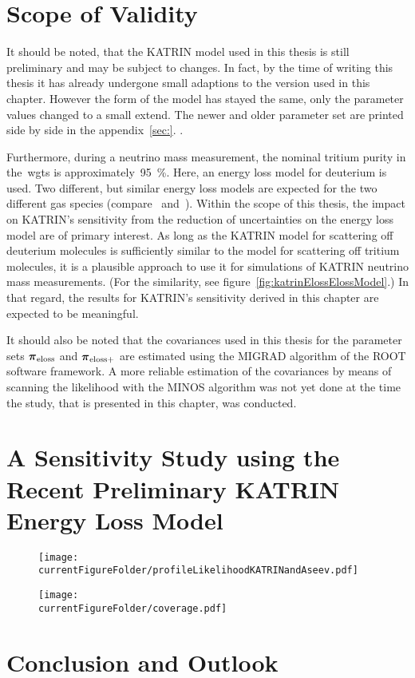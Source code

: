 \section{Scope of Validity}
It should be noted, that the KATRIN model used in this thesis is still preliminary and may be subject to changes. In fact, by the time of writing this thesis it has already undergone small adaptions to the version used in this chapter. However the form of the model has stayed the same, only the parameter values changed to a small extend. The newer and older parameter set are printed side by side in the appendix~\ref{sec:}. .

Furthermore, during a neutrino mass measurement, the nominal tritium purity in the~\gls{wgts} is approximately~\SI{95}{\percent}. Here, an energy loss model for deuterium is used. Two different, but similar energy loss models are expected for the two different gas species (compare~\cite{Abdurashitov2017} and~\cite{Aseev2000}). Within the scope of this thesis, the impact on KATRIN's sensitivity from the reduction of uncertainties on the energy loss model are of primary interest. As long as the KATRIN model for scattering off deuterium molecules is sufficiently similar to the model for scattering off tritium molecules, it is a plausible approach to use it for simulations of KATRIN neutrino mass measurements. (For the similarity, see figure~\ref{fig:katrinElossElossModel}.) In that regard, the results for KATRIN's sensitivity derived in this chapter are expected to be meaningful.

It should also be noted that the covariances used in this thesis for the parameter sets $\boldsymbol{\mathbf{\pi}}_\mathrm{eloss}$ and $\boldsymbol{\mathbf{\pi}}_\mathrm{eloss+}$ are estimated using the MIGRAD algorithm of the ROOT software framework. A more reliable estimation of the covariances by means of scanning the likelihood with the MINOS algorithm was not yet done at the time the study, that is presented in this chapter, was conducted.




\section{A Sensitivity Study using the Recent Preliminary KATRIN Energy Loss Model}
\label{sec:katrinElossModelResults}
\def\currentRootFolder{chapter/sensitivityStudyWithPreliminaryKatrinElossModel}
\def\currentFigureFolder{\currentRootFolder/fig}
\begin{figure}[th]
	\centering
	\texttt{[image: \\currentFigureFolder/profileLikelihoodKATRINandAseev.pdf]}
	\xcaption{}{}{}
	\label{fig:katrinElossResultsProfileLikelihood}
\end{figure}

\begin{figure}[th]
	\centering
	\texttt{[image: \\currentFigureFolder/coverage.pdf]}
	\label{fig:katrinElossResultsCoverage}
\end{figure}


\section{Conclusion and Outlook}
\label{sec:katrinElossModelConclusion}